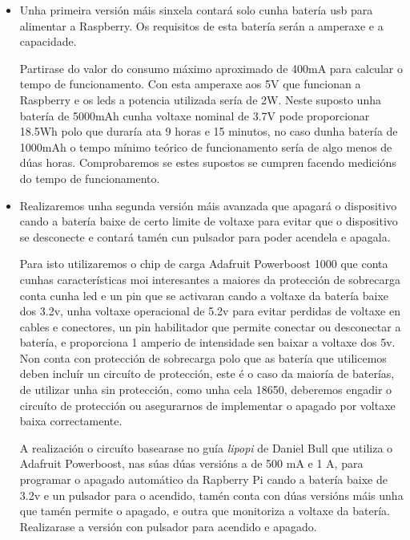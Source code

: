 \begin{itemize}
    \item Unha primeira versión máis sinxela contará solo cunha batería usb para alimentar a Raspberry. Os requisitos de esta batería serán a amperaxe e a capacidade.

    Partirase do valor do consumo máximo aproximado de 400mA para calcular o tempo de funcionamento. Con esta amperaxe aos 5V que funcionan a Raspberry e os leds a potencia utilizada sería de 2W. Neste suposto unha batería de  5000mAh cunha voltaxe nominal de 3.7V pode proporcionar 18.5Wh polo que duraría ata 9 horas e 15 minutos, no caso dunha batería de 1000mAh o tempo mínimo teórico de funcionamento sería de algo menos de dúas horas.
    Comprobaremos se estes supostos se cumpren facendo medicións do tempo de funcionamento.

    \item Realizaremos unha segunda versión máis avanzada que apagará o dispositivo cando a batería baixe de certo limite de voltaxe para evitar que o dispositivo se desconecte e contará tamén cun pulsador para poder acendela e apagala.

    Para isto utilizaremos o chip de carga Adafruit Powerboost 1000 que conta cunhas características moi interesantes a maiores da protección de sobrecarga conta cunha led e un pin que se activaran cando a voltaxe da batería baixe dos 3.2v, unha voltaxe operacional de 5.2v para evitar perdidas de voltaxe en cables e conectores, un pin habilitador que permite conectar ou desconectar a batería, e proporciona 1 amperio de intensidade sen baixar a voltaxe dos 5v. Non conta con protección de sobrecarga polo que as batería que utilicemos deben incluír un circuíto de protección, este é o caso da maioría de baterías, de utilizar unha sin protección, como unha cela 18650, deberemos engadir o circuíto de protección ou asegurarnos de implementar o apagado por voltaxe baixa correctamente.

    A realización o circuíto basearase no guía \emph{lipopi} de Daniel Bull que utiliza o Adafruit Powerboost, nas súas dúas versións a de 500 mA e 1 A, para programar o apagado automático da Rapberry Pi cando a batería baixe de 3.2v e un pulsador para o acendido, tamén conta con dúas versións máis unha que tamén permite o apagado, e outra que monitoriza a voltaxe da batería. Realizarase a versión con pulsador para acendido e apagado.


\end{itemize}
